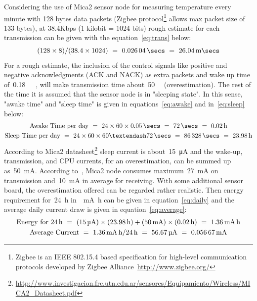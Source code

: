 \documentclass[12pt, oneandhalf, chaparabic, sees, ms]{metu}
\begin{document}
Considering the use of Mica2 sensor node for measuring temperature every minute with 128 bytes data packets (Zigbee protocol\footnote{Zigbee is an IEEE 802.15.4 based specification for high-level communication protocols developed by Zigbee Alliance~\url{http://www.zigbee.org/}} allows max packet size of 133 bytes), at 38.4Kbps (1 kilobit = 1024 bits) rough estimate for each 
transmission can be given with the equation~\ref{eq:trans} below:
\begin{equation}
(128 \times 8) / (38.4 \times 1024)~=~\SI{0.02604}{\secs}~=~\SI{26.04}{\milli\secs} \label{eq:trans}
\end{equation}
% 
%
%
For a rough estimate, the inclusion of the control signals like positive and negative acknowledgments (ACK and NACK) as extra packets and wake up time of~\SI{0.18}{\milli\secs}~\cite{polastre2005}, will make transmission time about~\SI{50}{\milli\secs} (overestimation). The rest of the time it is assumed that the sensor node is in "sleeping state". In this sense, "awake time" and "sleep time" is given in equations~\ref{eq:awake} and in~\ref{eq:sleep} below:
\begin{gather}
\text{Awake Time per day}~=~24 \times 60 \times \SI{0.05}{\secs}~=~\SI{72}{\secs}~=~\SI{0.02}{\hour} \label{eq:awake} \\
\text{Sleep Time per day}~=~24 \times 60 \times 60 – \SI{72}{\secs} ~=~ \SI{86328}{\secs}~=~\SI{23.98}{\hour} \label{eq:sleep}
\end{gather}
% 
%
%
According to Mica2 datasheet\footnote {\url{http://www.investigacion.frc.utn.edu.ar/sensores/Equipamiento/Wireless/MICA2_Datasheet.pdf}} sleep current is about~\SI{15}{\micro\ampere} 
and the wake-up, transmission, and CPU currents, for an overestimation, can be summed up as~\SI{50}{\milli\ampere}. According to~\cite{bazzi2015}, Mica2 node consumes maximum~\SI{27}{\milli\ampere}
on transmission and~\SI{10}{\milli\ampere} in average for receiving. With some additional sensor board, the overestimation offered can be regarded rather realistic.
Then energy requirement for~\SI{24}{\hour} in~\SI{}{\milli\ampere\hour} can be given in equation~\ref{eq:daily} and  the average daily 
current draw is given in equation~\ref{eq:average}:
\begin{gather}
\text{Energy for~\SI{24}{\hour}}~=~(\SI{15}{\micro\ampere})\times(\SI{23.98}{\hour}) + (\SI{50}{\milli\ampere})\times(\SI{0.02}{\hour})~=~\SI{1.36}{\milli\ampere\hour}\label{eq:daily}\\
\text{Average Current}~=~\SI{1.36}{\milli\ampere\hour} / \SI{24}{\hour}~=~\SI{56.67}{\micro\ampere}~=~\SI{0.05667}{\milli\ampere} \label{eq:average}
\end{gather}
% 
%
%
\end{document}
